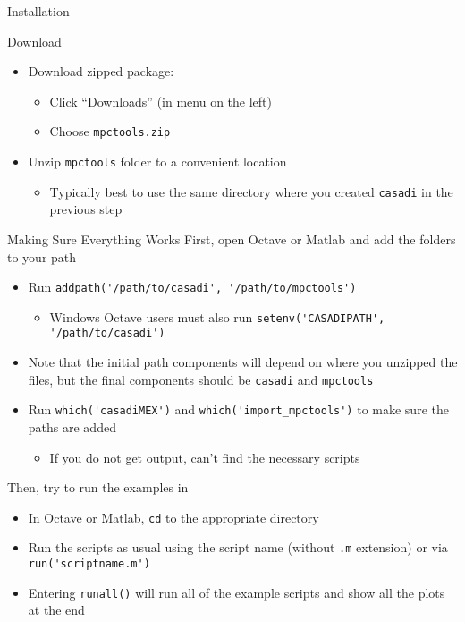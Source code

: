\documentclass[xcolor=dvipsnames]{beamer}
\begin{document}
\begin{frame}[allowframebreaks]{Installation}
    \medskip
    
    Download \mpctools{}
    \begin{itemize}
        \item Download zipped package: \bitbucketlink{}
        \begin{itemize}
            \item Click ``Downloads'' (in menu on the left)
            \item Choose \texttt{mpctools.zip}
        \end{itemize}
        \item Unzip \texttt{mpctools} folder to a convenient location
        \begin{itemize}
            \item Typically best to use the same directory where you created \texttt{casadi} in the previous step
        \end{itemize}
    \end{itemize}
\end{frame}

\begin{frame}{Making Sure Everything Works}
    First, open Octave or Matlab and add the folders to your path
    \begin{itemize}
        \item Run \lstinline!addpath('/path/to/casadi', '/path/to/mpctools')!
        \begin{itemize}
            \item Windows Octave users must also run \lstinline!setenv('CASADIPATH', '/path/to/casadi')!
        \end{itemize}
        \item Note that the initial path components will depend on where you unzipped the files, but the final components should be \texttt{casadi} and \texttt{mpctools}
        \item Run \lstinline!which('casadiMEX')! and \lstinline!which('import_mpctools')! to make sure the paths are added
        \begin{itemize}
            \item If you do not get output, \octave{} can't find the necessary scripts
        \end{itemize}
    \end{itemize}
    
    \medskip
    
    Then, try to run the examples in 
    \begin{itemize}
        \item In Octave or Matlab, \lstinline!cd! to the appropriate directory
        \item Run the scripts as usual using the script name (without \texttt{.m} extension) or via \lstinline!run('scriptname.m')!
        \item Entering \lstinline!runall()! will run all of the example scripts and show all the plots at the end
    \end{itemize}
\end{frame}
\end{document}
